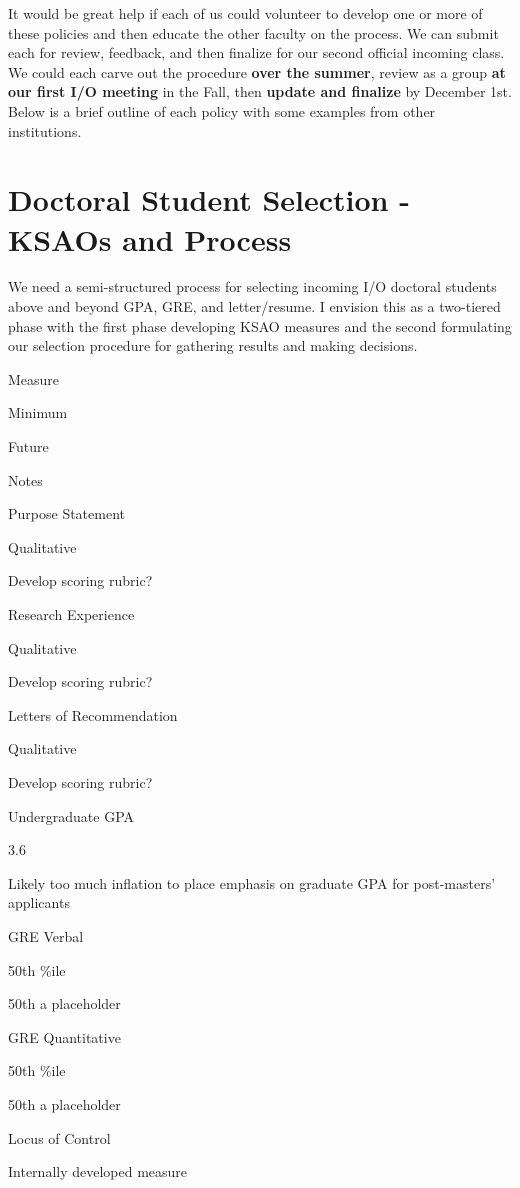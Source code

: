 \documentclass[
]{book}
\begin{document}
It would be great help if each of us could volunteer to develop one or more of these policies and then educate the other faculty on the process. We can submit each for review, feedback, and then finalize for our second official incoming class. We could each carve out the procedure \textbf{over the summer}, review as a group \textbf{at our first I/O meeting} in the Fall, then \textbf{update and finalize} by December 1st. Below is a brief outline of each policy with some examples from other institutions.

\hypertarget{select}{%
\chapter{Doctoral Student Selection - KSAOs and Process}\label{select}}

We need a semi-structured process for selecting incoming I/O doctoral students above and beyond GPA, GRE, and letter/resume. I envision this as a two-tiered phase with the first phase developing KSAO measures and the second formulating our selection procedure for gathering results and making decisions.

Measure

Minimum

Future

Notes

Purpose Statement

Qualitative

Develop scoring rubric?

Research Experience

Qualitative

Develop scoring rubric?

Letters of Recommendation

Qualitative

Develop scoring rubric?

Undergraduate GPA

3.6

Likely too much inflation to place emphasis on graduate GPA for post-masters' applicants

GRE Verbal

50th \%ile

50th a placeholder

GRE Quantitative

50th \%ile

50th a placeholder

Locus of Control

Internally developed measure
\end{document}

